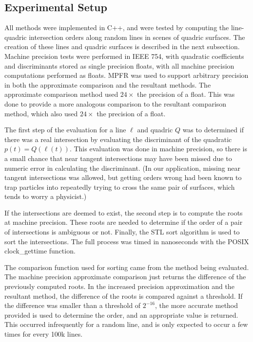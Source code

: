 \documentclass{cccg16}
\begin{document}
\subsection{Experimental Setup}
All methods were implemented in C++, and were tested by computing the
line-quadric intersection orders along random lines in scenes of
quadric surfaces. The creation of these lines and quadric surfaces is
described in the next subsection.  Machine precision tests were
performed in IEEE 754, with quadratic coefficients and discriminants
stored as single precision floats, with all machine precision
computations performed as floats.  MPFR\cite{mpfr} was used to support
arbitrary precision in both the approximate comparison and the
resultant methods.  The approximate comparison method used $24\times$
the precision of a float.  This was done to provide a more analogous
comparison to the resultant comparison method, which also used
$24\times$ the precision of a float.

The first step of the evaluation for a line $\ell$ and quadric $Q$ was
to determined if there was a real intersection by evaluating the
discriminant of the quadratic~$p(t)=Q(\ell(t))$.  This evaluation was
done in machine precision, so there is a small chance that near
tangent intersections may have been missed due to numeric error in
calculating the discriminant. (In our application, missing near
tangent intersections was allowed, but getting orders wrong had been
known to trap particles into repeatedly trying to cross the same pair
of surfaces, which tends to worry a physicist.)

If the intersections are deemed to exist, the second step is to
compute the roots at machine precision.  These roots are needed to
determine if the order of a pair of intersections is ambiguous or not.
Finally, the STL sort algorithm is used to sort the intersections.
The full process was timed in nanoseconds with the POSIX
clock\_gettime function.

The comparison function used for sorting came from the method being
evaluated.  The machine precision approximate comparison just returns
the difference of the previously computed roots.  In the increased
precision approximation and the resultant method, the difference of
the roots is compared against a threshold.  If the difference was
smaller than a threshold of $2^{-16}$, the more accurate method
provided is used to determine the order, and an appropriate value is
returned.  This occurred infrequently for a random line, and is only
expected to occur a few times for every 100k lines.
\end{document}
